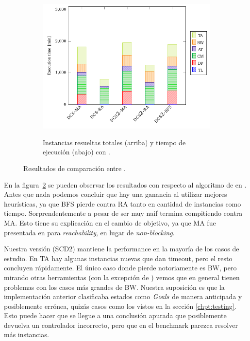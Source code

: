 \begin{figure}[th]
\begin{subfigure}{0.5\textwidth}
        \includegraphics[width=\linewidth]{figures/benchmark/dcs_time.pdf}\label{fig:dcs:results:time}
        \caption{Instancias resueltas totales (arriba) y tiempo de ejecución (abajo) con \DCS.}
    \end{subfigure}
\caption{Resultados de comparación entre \DCS.}
\label{fig:dcs:results}
\end{figure}

En la figura~\ref{fig:dcs:results} se pueden observar los resultados con respecto al algoritmo de \DCS en \cite{tesisDani}. Antes que nada podemos concluir que hay una ganancia al utilizar mejores heurísticas, ya que BFS pierde contra RA tanto en cantidad de instancias como tiempo. Sorprendentemente a pesar de ser muy naif termina compitiendo contra MA. Esto tiene su explicación en el cambio de objetivo, ya que MA fue presentada en \cite{Ciolek:2016:DCS} para \textit{reachability}, en lugar de \textit{non-blocking}.

Nuestra versión (SCD2) mantiene la performance en la mayoría de los casos de estudio. En TA hay algunas instancias nuevas que dan timeout, pero el resto concluyen rápidamente. El único caso donde pierde notoriamente es BW, pero mirando otras herramientas (con la excepción de \MYND) vemos que en general tienen problemas con los casos más grandes de BW. Nuestra suposición es que la implementación \DCS anterior clasificaba estados como $\mathit{Goals}$ de manera anticipada y posiblemente errónea, quizás casos como los vistos en la sección \ref{chpt:testing}. Esto puede hacer que se llegue a una conclusión apurada que posiblemente devuelva un controlador incorrecto, pero que en el benchmark parezca resolver más instancias.

